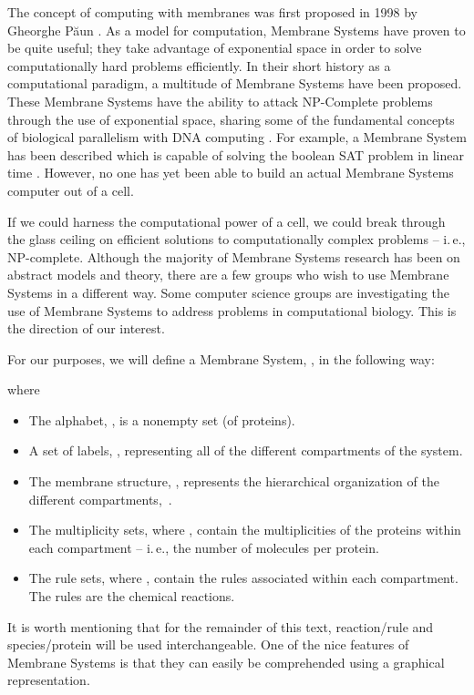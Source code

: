 \documentclass[copyright]{eptcs}
\newcommand{\noi}{\noindent}
\begin{document}
The concept of computing with membranes was first proposed in 1998 by Gheorghe P\u aun \cite{gpaun98}.  As a model for computation, Membrane Systems have proven to be quite useful; they take advantage of exponential space in order to solve computationally hard problems efficiently.  In their short history as a computational paradigm, a multitude of Membrane Systems have been proposed.   These Membrane Systems have the ability to attack NP-Complete problems through the use of exponential space, sharing some of the fundamental concepts of biological parallelism with DNA computing \cite{adleman94}.  For example, a Membrane System has been described which is capable of solving the boolean SAT problem in linear time \cite{ferretti00}. However, no one has yet been able to build an actual Membrane Systems computer out of a cell.

If we could harness the computational power of a cell, we could break through the glass ceiling on efficient solutions to computationally complex problems -- i.\,e., NP-complete.  Although the majority of Membrane Systems research has been on abstract models and theory, there are a few groups who wish to use Membrane Systems in a different way.  Some computer science groups are investigating the use of Membrane Systems to address problems in computational biology.  This is the direction of our interest.

For our purposes, we will define a Membrane System, , in the following way:


\noi where
\begin{itemize}
\item The alphabet, , is a nonempty set (of proteins).
\item A set of labels, , representing all of the different compartments of the system.
\item The membrane structure, , represents the hierarchical organization of the 
different compartments,~.
\item The multiplicity sets,  where , contain the multiplicities of the proteins within each compartment -- i.\,e., the number of molecules per protein.
\item The rule sets,  where , contain the rules associated within each compartment.  The rules are the chemical reactions.
\end{itemize}

It is worth mentioning that for the remainder of this text, reaction/rule and species/protein will be used interchangeable.  One of the nice features of Membrane Systems is that they can easily be comprehended using a graphical representation.
\end{document}
